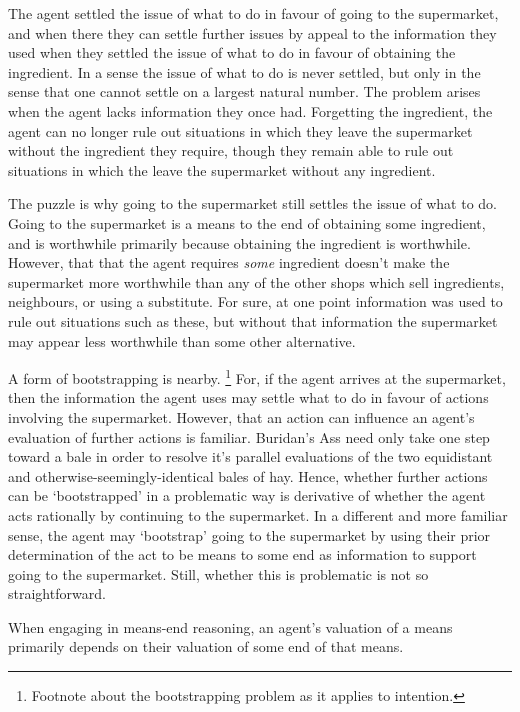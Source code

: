 \documentclass[10pt]{article}
\begin{document}
The agent settled the issue of what to do in favour of going to the supermarket, and when there they can settle further issues by appeal to the information they used when they settled the issue of what to do in favour of obtaining the ingredient.
In a sense the issue of what to do is never settled, but only in the sense that one cannot settle on a largest natural number.
The problem arises when the agent lacks information they once had.
Forgetting the ingredient, the agent can no longer rule out situations in which they leave the supermarket without the ingredient they require, though they remain able to rule out situations in which the leave the supermarket without any ingredient.

The puzzle is why going to the supermarket still settles the issue of what to do.
Going to the supermarket is a means to the end of obtaining some ingredient, and is worthwhile primarily because obtaining the ingredient is worthwhile.
However, that that the agent requires \emph{some} ingredient doesn't make the supermarket more worthwhile than any of the other shops which sell ingredients, neighbours, or using a substitute.
For sure, at one point information was used to rule out situations such as these, but without that information the supermarket may appear less worthwhile than some other alternative.

A form of bootstrapping is nearby.\nolinebreak
\footnote{Footnote about the bootstrapping problem as it applies to intention.}
For, if the agent arrives at the supermarket, then the information the agent uses may settle what to do in favour of actions involving the supermarket.
However, that an action can influence an agent's evaluation of further actions is familiar.
Buridan's Ass need only take one step toward a bale in order to resolve it's parallel evaluations of the two equidistant and otherwise-seemingly-identical bales of hay.
Hence, whether further actions can be `bootstrapped' in a problematic way is derivative of whether the agent acts rationally by continuing to the supermarket.
In a different and more familiar sense, the agent may `bootstrap' going to the supermarket by using their prior determination of the act to be means to some end as information to support going to the supermarket.
Still, whether this is problematic is not so straightforward.


\begin{principle}\label{princip:dependency}
  When engaging in means-end reasoning, an agent's valuation of a means primarily depends on their valuation of some end of that means.
\end{principle}
\end{document}

